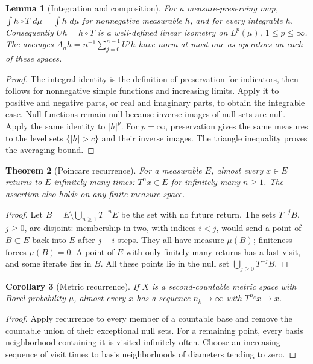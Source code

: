 \documentclass[11pt,oneside]{book}
\newtheorem{theorem}{Theorem}[chapter]
\newtheorem{lemma}[theorem]{Lemma}
\newtheorem{corollary}[theorem]{Corollary}
\theoremstyle{definition}
\theoremstyle{remark}\newtheorem{remark}[theorem]{Remark}
\newcommand{\dd}{\,d}\newcommand{\id}{\operatorname{id}}
\newcommand{\abs}[1]{\lvert#1\rvert}\newcommand{\norm}[1]{\lVert#1\rVert}
\begin{document}
\begin{lemma}[Integration and composition]\label{d13:19:composition-isometry}
For a measure-preserving map, \(\int h\circ T\,\dd\mu=\int h\,\dd\mu\)
for nonnegative measurable \(h\), and for every integrable \(h\).
Consequently \(Uh=h\circ T\) is a well-defined linear isometry on
\(L^p(\mu)\), \(1\leq p\leq\infty\).
The averages \(A_nh=n^{-1}\sum_{j=0}^{n-1}U^jh\) have norm at most one
as operators on each of these spaces.
\end{lemma}
\begin{proof}
The integral identity is the definition of preservation for indicators,
then follows for nonnegative simple functions and increasing limits.
Apply it to positive and negative parts, or real and imaginary parts,
to obtain the integrable case. Null functions remain null because
inverse images of null sets are null. Apply the same identity to
\(\abs{h}^p\). For \(p=\infty\), preservation gives the same measures
to the level sets \(\{\abs{h}>c\}\) and their inverse images.
The triangle inequality proves the averaging bound.
\end{proof}

\begin{theorem}[Poincare recurrence]\label{d13:19:poincare-recurrence}
For a measurable \(E\), almost every \(x\in E\) returns to \(E\)
infinitely many times: \(T^nx\in E\) for infinitely many \(n\geq1\).
The assertion also holds on any finite measure space.
\end{theorem}
\begin{proof}
Let \(B=E\setminus\bigcup_{n\geq1}T^{-n}E\) be the set with no future
return. The sets \(T^{-j}B\), \(j\geq0\), are disjoint: membership in
two, with indices \(i<j\), would send a point of \(B\subset E\)
back into \(E\) after \(j-i\) steps. They all have measure \(\mu(B)\);
finiteness forces \(\mu(B)=0\). A point of \(E\) with only finitely
many returns has a last visit, and some iterate lies in \(B\).
All these points lie in the null set \(\bigcup_{j\geq0}T^{-j}B\).
\end{proof}

\begin{corollary}[Metric recurrence]\label{d13:19:metric-recurrence}
If \(X\) is a second-countable metric space with Borel probability
\(\mu\), almost every \(x\) has a sequence \(n_k\to\infty\) with
\(T^{n_k}x\to x\).
\end{corollary}
\begin{proof}
Apply recurrence to every member of a countable base and remove
the countable union of their exceptional null sets.
For a remaining point, every basis neighborhood containing it is
visited infinitely often. Choose an increasing sequence of visit
times to basis neighborhoods of diameters tending to zero.
\end{proof}
\end{document}

